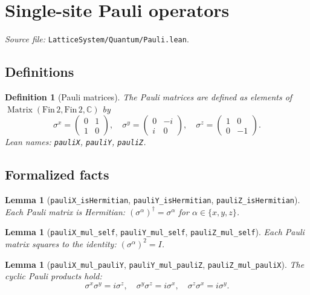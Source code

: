 \documentclass[a4paper,11pt]{article}
\newtheorem{lemma}[theorem]{Lemma}
\newtheorem{definition}[theorem]{Definition}
\begin{document}
\section{Single-site Pauli operators}
\label{sec:pauli}

\emph{Source file:} \texttt{LatticeSystem/Quantum/Pauli.lean}.

\subsection{Definitions}

\begin{definition}[Pauli matrices]
The Pauli matrices are defined as elements of
$\operatorname{Matrix}(\mathrm{Fin}\,2, \mathrm{Fin}\,2, \mathbb{C})$ by
\[
  \sigma^x = \begin{pmatrix} 0 & 1 \\ 1 & 0 \end{pmatrix},\quad
  \sigma^y = \begin{pmatrix} 0 & -i \\ i & 0 \end{pmatrix},\quad
  \sigma^z = \begin{pmatrix} 1 & 0 \\ 0 & -1 \end{pmatrix}.
\]
Lean names: \texttt{pauliX}, \texttt{pauliY}, \texttt{pauliZ}.
\end{definition}

\subsection{Formalized facts}

\begin{lemma}[\texttt{pauliX\_isHermitian}, \texttt{pauliY\_isHermitian},
\texttt{pauliZ\_isHermitian}]
Each Pauli matrix is Hermitian: $(\sigma^\alpha)^\dagger = \sigma^\alpha$
for $\alpha \in \{x, y, z\}$.
\end{lemma}

\begin{lemma}[\texttt{pauliX\_mul\_self}, \texttt{pauliY\_mul\_self},
\texttt{pauliZ\_mul\_self}]
Each Pauli matrix squares to the identity: $(\sigma^\alpha)^2 = I$.
\end{lemma}

\begin{lemma}[\texttt{pauliX\_mul\_pauliY}, \texttt{pauliY\_mul\_pauliZ},
\texttt{pauliZ\_mul\_pauliX}]
The cyclic Pauli products hold:
\[
  \sigma^x \sigma^y = i \sigma^z,\quad
  \sigma^y \sigma^z = i \sigma^x,\quad
  \sigma^z \sigma^x = i \sigma^y.
\]
\end{lemma}
\end{document}
